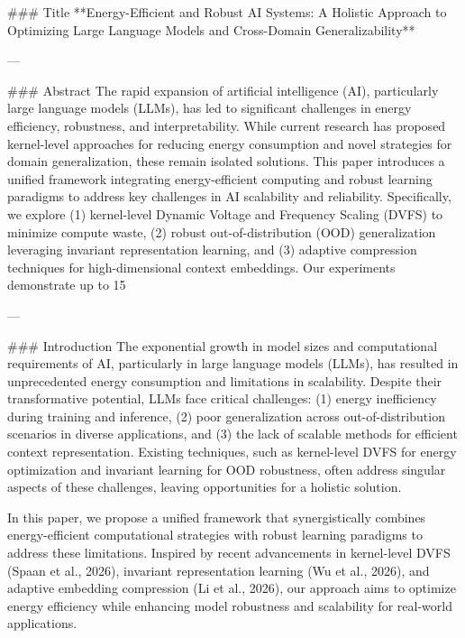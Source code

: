 ### Title
**Energy-Efficient and Robust AI Systems: A Holistic Approach to Optimizing Large Language Models and Cross-Domain Generalizability**

---

### Abstract
The rapid expansion of artificial intelligence (AI), particularly large language models (LLMs), has led to significant challenges in energy efficiency, robustness, and interpretability. While current research has proposed kernel-level approaches for reducing energy consumption and novel strategies for domain generalization, these remain isolated solutions. This paper introduces a unified framework integrating energy-efficient computing and robust learning paradigms to address key challenges in AI scalability and reliability. Specifically, we explore (1) kernel-level Dynamic Voltage and Frequency Scaling (DVFS) to minimize compute waste, (2) robust out-of-distribution (OOD) generalization leveraging invariant representation learning, and (3) adaptive compression techniques for high-dimensional context embeddings. Our experiments demonstrate up to 15%

---

### Introduction
The exponential growth in model sizes and computational requirements of AI, particularly in large language models (LLMs), has resulted in unprecedented energy consumption and limitations in scalability. Despite their transformative potential, LLMs face critical challenges: (1) energy inefficiency during training and inference, (2) poor generalization across out-of-distribution scenarios in diverse applications, and (3) the lack of scalable methods for efficient context representation. Existing techniques, such as kernel-level DVFS for energy optimization and invariant learning for OOD robustness, often address singular aspects of these challenges, leaving opportunities for a holistic solution.

In this paper, we propose a unified framework that synergistically combines energy-efficient computational strategies with robust learning paradigms to address these limitations. Inspired by recent advancements in kernel-level DVFS (Spaan et al., 2026), invariant representation learning (Wu et al., 2026), and adaptive embedding compression (Li et al., 2026), our approach aims to optimize energy efficiency while enhancing model robustness and scalability for real-world applications.


